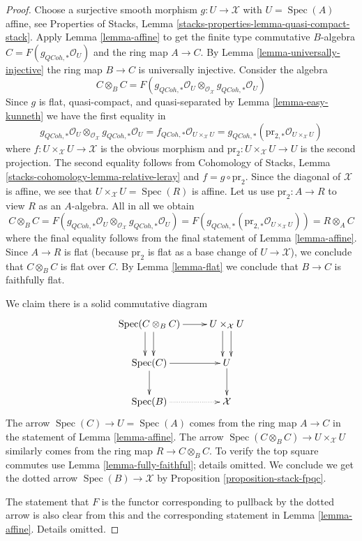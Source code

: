 \documentclass{stacks-project}
\theoremstyle{plain}
\theoremstyle{definition}
\theoremstyle{remark}
\numberwithin{equation}{subsection}
\def\Spec{\mathop{\mathrm{Spec}}}
\def\QCoh{\mathit{QCoh}}
\begin{document}
\begin{proof}
Choose a surjective smooth morphism $g : U \to \mathcal{X}$ with $U = \Spec(A)$
affine, see Properties of Stacks, Lemma
\ref{stacks-properties-lemma-quasi-compact-stack}. Apply
Lemma \ref{lemma-affine} to get the finite type
commutative $B$-algebra $C = F(g_{\QCoh, *}\mathcal{O}_U)$
and the ring map $A \to C$.
By Lemma \ref{lemma-universally-injective}
the ring map $B \to C$ is universally injective.
Consider the algebra
$$
C \otimes_B C =
F(g_{\QCoh, *}\mathcal{O}_U
\otimes_{\mathcal{O}_\mathcal{X}}
g_{\QCoh, *}\mathcal{O}_U)
$$
Since $g$ is flat, quasi-compact, and quasi-separated
by Lemma \ref{lemma-easy-kunneth} we have the first equality in
$$
g_{\QCoh, *}\mathcal{O}_U
\otimes_{\mathcal{O}_\mathcal{X}}
g_{\QCoh, *}\mathcal{O}_U
=
f_{\QCoh, *}\mathcal{O}_{U \times_\mathcal{X} U} =
g_{\QCoh, *}(\text{pr}_{2, *}\mathcal{O}_{U \times_\mathcal{X} U})
$$
where
$f : U \times_\mathcal{X} U \to \mathcal{X}$ is the obvious morphism
and $\text{pr}_2 : U \times_\mathcal{X} U \to U$ is the second
projection. The second equality follows from
Cohomology of Stacks, Lemma \ref{stacks-cohomology-lemma-relative-leray}
and $f = g \circ \text{pr}_2$. Since the diagonal of $\mathcal{X}$
is affine, we see that $U \times_\mathcal{X} U = \Spec(R)$ is affine.
Let us use $\text{pr}_2 : A \to R$ to view $R$ as an $A$-algebra.
All in all we obtain
$$
C \otimes_B C =
F(g_{\QCoh, *}\mathcal{O}_U
\otimes_{\mathcal{O}_\mathcal{X}}
g_{\QCoh, *}\mathcal{O}_U) =
F(g_{\QCoh, *}(\text{pr}_{2, *}\mathcal{O}_{U \times_\mathcal{X} U})) =
R \otimes_A C
$$
where the final equality follows from the final statement of
Lemma \ref{lemma-affine}. Since $A \to R$ is flat (because
$\text{pr}_2$ is flat as a base change of $U \to \mathcal{X}$),
we conclude that $C \otimes_B C$ is flat over $C$.
By Lemma \ref{lemma-flat} we conclude that $B \to C$ is faithfully flat.

\medskip\noindent
We claim there is a solid commutative diagram
$$
\xymatrix{
\Spec(C \otimes_B C) \ar@<1ex>[d] \ar@<-1ex>[d] \ar[r] &
U \times_\mathcal{X} U \ar@<1ex>[d] \ar@<-1ex>[d] \\
\Spec(C) \ar[d] \ar[r] &
U \ar[d] \\
\Spec(B) \ar@{..>}[r] &
\mathcal{X}
}
$$
The arrow $\Spec(C) \to U = \Spec(A)$ comes from the ring map
$A \to C$ in the statement of Lemma \ref{lemma-affine}.
The arrow $\Spec(C \otimes_B C) \to U \times_\mathcal{X} U$
similarly comes from the ring map $R \to C \otimes_B C$.
To verify the top square commutes use Lemma \ref{lemma-fully-faithful};
details omitted.
We conclude we get the dotted arrow $\Spec(B) \to \mathcal{X}$
by Proposition \ref{proposition-stack-fpqc}.

\medskip\noindent
The statement that $F$ is the functor corresponding to pullback
by the dotted arrow is also clear from this and the corresponding
statement in Lemma \ref{lemma-affine}. Details omitted.
\end{proof}
\end{document}
